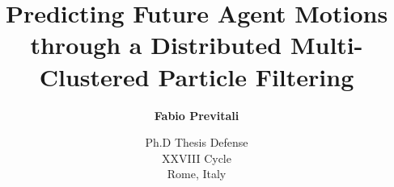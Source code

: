 \documentclass{beamer}
\title[Predicting Future Agent Motions through a Distributed Multi-Clustered PF]{\Large Predicting Future Agent Motions through a Distributed Multi- Clustered Particle Filtering}
\subtitle{}
\author[Fabio Previtali]{\Large\textbf{Fabio Previtali}}
\date[April 14, 2016]{Ph.D Thesis Defense\\XXVIII Cycle\\Rome, Italy}
\begin{document}
\begin{frame}[plain]
	\titlepage
\end{frame}










\tiny


\end{document}

